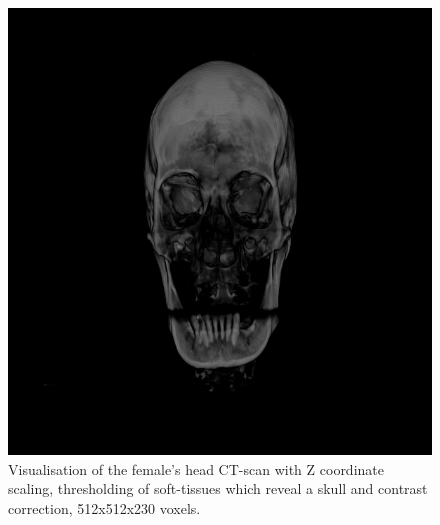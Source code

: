 \documentclass[twoside, english, 11pt]{report}
\begin{document}
\begin{figure}[H]
\centerline{\includegraphics[scale = 0.45]{img/head-th-win}}
\caption{Visualisation of the female's head CT-scan with Z coordinate scaling, thresholding of soft-tissues which reveal a skull and contrast correction, 512x512x230 voxels.\label{fig:head-th-win}}
\end{figure}
\end{document}
